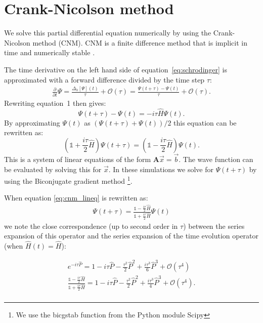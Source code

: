 \section{Crank-Nicolson method}
We solve this partial differential equation numerically by using the Crank-Nicolson method (CNM). CNM is a finite difference method that is implicit in time and numerically stable \cite{cnm}. 

The time derivative on the left hand side of equation~\ref{eq:schrodinger} is approximated with a forward difference divided by the time step $\tau$:
\begin{gather*}
    \frac{\partial}{\partial t}\Psi 
    = \frac{\Delta_h[\Psi](t)}{\tau} + \mathcal{O}(\tau)
    = \frac{\Psi(t + \tau) - \Psi(t)}{\tau} + \mathcal{O}(\tau).
\end{gather*} Rewriting equation~1 then gives:
\[
    \Psi(t+\tau)-\Psi(t) 
    = -i\tau\hat{H}\Psi(t).
\] By approximating $\Psi(t)$ as $\left(\Psi(t+\tau)+\Psi(t)\right)/2$ this equation can be rewritten as:
\begin{equation}\label{eq:cnm_lineq}
    \left(\mathbb{1}+\frac{i\tau}{2}\hat{H}\right)\Psi(t+\tau) 
    = \left(\mathbb{1}-\frac{i\tau}{2}\hat{H}\right)\Psi(t).
\end{equation} This is a system of linear equations of the form $\mathbf{A}\vec{x}=\vec{b}$. The wave function can be evaluated by solving this for $\vec{x}$. In these simulations we solve for $\Psi(t+\tau)$ by using the Biconjugate gradient method \footnote{We use the bicgstab function from the Python module Scipy}.

When equation \ref{eq:cnm_lineq} is rewritten as:
\begin{gather*}
\Psi(t+\tau) 
    = \frac{\mathbb{1}-\frac{i\tau}{2}\hat{H}}{\mathbb{1}+\frac{i\tau}{2}\hat{H}}\Psi(t)
\end{gather*} we note the close correspondence (up to second order in $\tau$) between the series expansion of this operator and the series expansion of the time evolution operator (when $\hat{H}(t) = \hat{H}$):


\begin{gather*}
e^{-i\tau\hat{P}} = 1 - i \tau\hat{P} - \frac{\tau^2}{2}\hat{P}^2 + \frac{i\tau^3}{6}\hat{P}^3 + \mathcal{O}(\tau^4)\\
\frac{\mathbb{1}-\frac{i\tau}{2}\hat{H}}{\mathbb{1}+\frac{i\tau}{2}\hat{H}} = 1 - i \tau\hat{P} - \frac{\tau^2}{2}\hat{P}^2 + \frac{i\tau^3}{4}\hat{P}^3 + \mathcal{O}(\tau^4).\\
\end{gather*}


